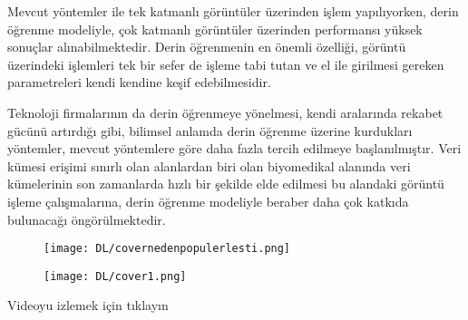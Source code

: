 \documentclass{beamer}                                                                                          %
\begin{document}
   
    \begin{frame}{}
        \justifying
	        Mevcut yöntemler ile tek katmanlı görüntüler üzerinden işlem yapılıyorken, derin öğrenme modeliyle, çok katmanlı görüntüler üzerinden performansı yüksek sonuçlar alınabilmektedir. Derin öğrenmenin en önemli özelliği, görüntü üzerindeki işlemleri tek bir sefer de işleme tabi tutan ve el ile girilmesi gereken parametreleri kendi kendine keşif edebilmesidir.
    \end{frame}
    
    
    \begin{frame}{}
	    \justifying
    	   Teknoloji firmalarının da derin öğrenmeye yönelmesi, kendi aralarında rekabet gücünü artırdığı gibi, bilimsel anlamda derin öğrenme üzerine kurdukları yöntemler, mevcut yöntemlere göre daha fazla tercih edilmeye başlanılmıştır. Veri kümesi erişimi sınırlı olan alanlardan biri olan biyomedikal alanında veri kümelerinin son zamanlarda hızlı bir şekilde elde edilmesi bu alandaki görüntü işleme çalışmalarına, derin öğrenme modeliyle beraber daha çok katkıda bulunacağı öngörülmektedir.
    \end{frame}
    
    
    \begin{frame}{}
        \begin{center}
            \begin{figure}
                \vspace*{-7mm}
                \hspace*{-18.5 pt}
                \centering
                \texttt{[image: DL/covernedenpopulerlesti.png]}
            \end{figure}
        \end{center}
    \end{frame} 
    
    
    \begin{frame}
        \begin{center}
            \begin{figure}
                \vspace*{-7mm}
                \hspace*{-6}
                \texttt{[image: DL/cover1.png]}
            \end{figure}
        \end{center}
        \newline
        \centering
        Videoyu izlemek için tıklayın\par \vspace{20}
        \href{https://photos.google.com/share/AF1QipOpKp7BjBs00qE-n09qDtEPVdiAzcuJFpnHOmVW4NsrG5qtrSSZYkWUAuuBawb9LQ/photo/AF1QipPccbDKgPmdqFLUeoS_cpXov0966ba-Rmu5XGsM?key=YVI3cG9VS3EtNVNJR0VtRXVlTkFfemtuM29hNEhB}{\huge {}}
    \end{frame}
    
\end{document}
